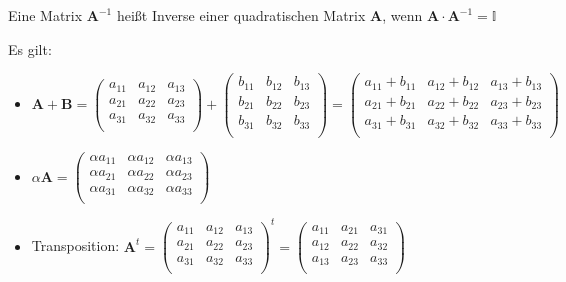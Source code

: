 \begin{frameddefn}
	Eine Matrix $\mathbf{A}^{-1}$ heißt Inverse einer quadratischen Matrix $\mathbf{A}$, wenn $\mathbf{A} \cdot \mathbf{A}^{-1} = \mathbb{I}$
\end{frameddefn}

Es gilt:
\begin{itemize}
	\item $\mathbf{A} + \mathbf{B} = 
	\left(\begin{array}{rrr} 
		a_{11} & a_{12} & a_{13} \\ 
		a_{21} & a_{22} & a_{23} \\ 
		a_{31} & a_{32} & a_{33} \\ 
	\end{array}\right) +
	\left(\begin{array}{rrr} 
		b_{11} & b_{12} & b_{13} \\ 
		b_{21} & b_{22} & b_{23} \\ 
		b_{31} & b_{32} & b_{33} \\ 
	\end{array}\right) = 
	\left(\begin{array}{rrr} 
		a_{11} + b_{11} & a_{12} + b_{12} & a_{13} + b_{13} \\ 
		a_{21} + b_{21} & a_{22} + b_{22} & a_{23} + b_{23} \\ 
		a_{31} + b_{31} & a_{32} + b_{32} & a_{33} + b_{33} \\ 
	\end{array}\right)$

	\item $\alpha \mathbf{A} = \left(\begin{array}{rrr} 
		\alpha a_{11} & \alpha a_{12} & \alpha a_{13} \\ 
		\alpha a_{21} & \alpha a_{22} & \alpha a_{23} \\ 
		\alpha a_{31} & \alpha a_{32} & \alpha a_{33} \\ 
	\end{array}\right)$

	\item Transposition: $\mathbf{A}^t = 
	\left(\begin{array}{rrr} 
		a_{11} & a_{12} & a_{13} \\ 
		a_{21} & a_{22} & a_{23} \\ 
		a_{31} & a_{32} & a_{33} \\ 
	\end{array}\right)^t = 
	\left(\begin{array}{rrr} 
		a_{11} & a_{21} & a_{31} \\ 
		a_{12} & a_{22} & a_{32} \\ 
		a_{13} & a_{23} & a_{33} \\ 
	\end{array}\right)$


\end{itemize}
